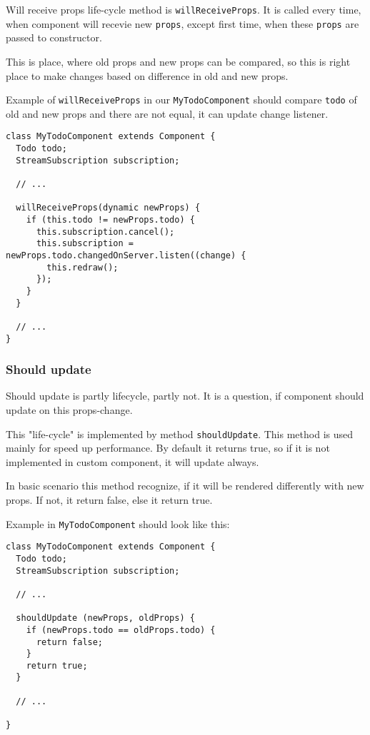 \documentclass[oneside, 12pt]{book}
\begin{document}
      Will receive props life-cycle method is \texttt{willReceiveProps}. 
      It is called every time, when component will recevie new \texttt{props}, 
      except first time, when these \texttt{props} are passed to constructor.

      This is place, where old props and new props can be compared, 
      so this is right place to make changes based on difference in old and new props.

      Example of \texttt{willReceiveProps} in our \texttt{MyTodoComponent} 
      should compare \texttt{todo} of old and new props and there are not equal, 
      it can update change listener.
      \begin{verbatim}
class MyTodoComponent extends Component {
  Todo todo;
  StreamSubscription subscription;

  // ...

  willReceiveProps(dynamic newProps) {
    if (this.todo != newProps.todo) {
      this.subscription.cancel();
      this.subscription = newProps.todo.changedOnServer.listen((change) {
        this.redraw();
      });
    }
  }

  // ...
}
      \end{verbatim}



      
    \subsubsection{Should update}\label{subsec:our-architecture-lifecycle-shouldupdate}
      Should update is partly lifecycle, partly not. 
      It is a question, if component should update on  this props-change. 

      This "life-cycle" is implemented by method \texttt{shouldUpdate}. 
      This method is used mainly for speed up performance. 
      By default it returns true, 
      so if it is not implemented in custom component, 
      it will update always.

      In basic scenario this method recognize, 
      if it will be rendered differently with new props.  
      If not, it return false, else it return true.

      Example in \texttt{MyTodoComponent} should look like this:
      \begin{verbatim}
class MyTodoComponent extends Component {
  Todo todo;
  StreamSubscription subscription;

  // ...

  shouldUpdate (newProps, oldProps) {
    if (newProps.todo == oldProps.todo) {
      return false;
    }
    return true;
  }

  // ...

}
      \end{verbatim}
\end{document}
